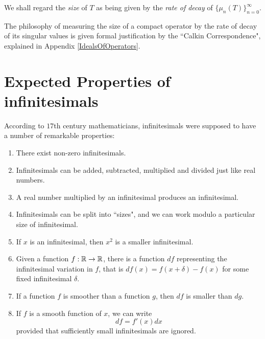 We shall regard the \emph{size} of $T$ as being given by the \emph{rate of decay}
of $\{\mu_n(T)\}_{n=0}^\infty$. 

The philosophy of measuring the size of a compact operator
by the rate of decay of its singular values is given formal justification
by the ``Calkin Correspondence", explained in Appendix \ref{IdealsOfOperators}.

\section{Expected Properties of infinitesimals}
According to $17$th century mathematicians, infinitesimals were supposed
to have a number of remarkable properties:
\begin{enumerate}
    \item{} There exist non-zero infinitesimals.
    \item{} Infinitesimals can be added, subtracted, multiplied and divided
    just like real numbers.
    \item{} A real number multiplied by an infinitesimal produces an infinitesimal.
    \item{} Infinitesimals can be split into ``sizes", and we can work modulo
    a particular size of infinitesimal.
    \item{} If $x$ is an infinitesimal, then $x^2$ is a smaller infinitesimal.
    \item{} Given a function $f:\mathbb{R}\rightarrow\mathbb{R}$, there is a function $df$
    representing the infinitesimal variation in $f$, that is $df(x) = f(x+\delta)-f(x)$
    for some fixed infinitesimal $\delta$.
    \item{} If a function $f$ is smoother than a function $g$, then $df$ is smaller
    than $dg$.
    \item{} If $f$ is a smooth function of $x$, we can write
    \begin{equation}
        df = f'(x)dx
    \end{equation}
    provided that sufficiently small infinitesimals are ignored.
\end{enumerate}

